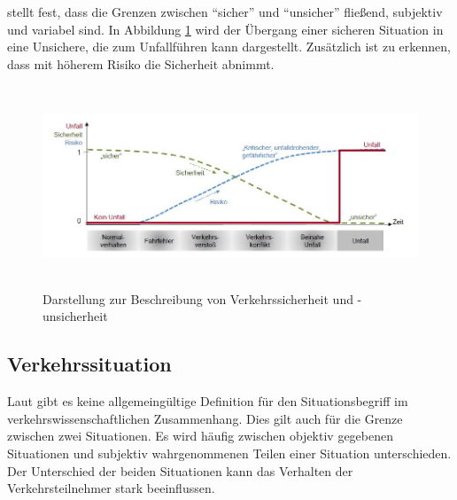 \Textcite[S. 10]{Hoffmann.26.04.2013} stellt fest, dass die Grenzen  zwischen \enquote{sicher} und \enquote{unsicher} fließend, subjektiv und variabel sind. In Abbildung \ref{fig:sicher_unsicher} wird der Übergang einer sicheren Situation in eine Unsichere, die zum Unfallführen kann dargestellt. Zusätzlich ist zu erkennen, dass mit höherem Risiko die Sicherheit abnimmt. 

\begin{savenotes}
	\begin{figure}[H]
		\centering
		\includegraphics[width=14cm,height=6cm]{figures/sicher_unsicher}
		\caption[Darstellung zur Beschreibung von Verkehrssicherheit und -unsicherheit]{Darstellung zur Beschreibung von Verkehrssicherheit und -unsicherheit \parencite[S. 10]{Hoffmann.26.04.2013}}\label{fig:sicher_unsicher}
	\end{figure}
\end{savenotes}

\subsection{Verkehrssituation}
Laut \Textcite[S. 6-8]{Hoffmann.26.04.2013} gibt es keine allgemeingültige Definition für den Situationsbegriff im verkehrswissenschaftlichen Zusammenhang. Dies gilt auch für die Grenze zwischen zwei Situationen. Es wird häufig zwischen objektiv gegebenen Situationen und subjektiv wahrgenommenen Teilen einer Situation unterschieden. Der Unterschied der beiden Situationen kann das Verhalten der Verkehrsteilnehmer stark beeinflussen.

